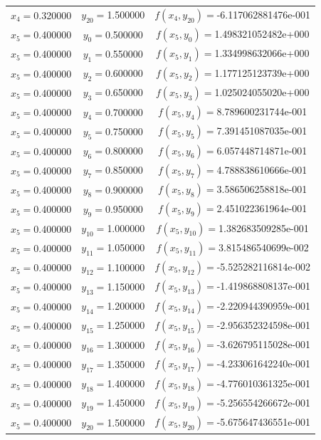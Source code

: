 \begin{longtable}{ccc}
$x_{4}=$0.320000 & $y_{20}=$1.500000 & $f(x_{4},y_{20})=$-6.117062881476e-001 \\
$x_{5}=$0.400000 & $y_{0}=$0.500000 & $f(x_{5},y_{0})=$1.498321052482e+000 \\
$x_{5}=$0.400000 & $y_{1}=$0.550000 & $f(x_{5},y_{1})=$1.334998632066e+000 \\
$x_{5}=$0.400000 & $y_{2}=$0.600000 & $f(x_{5},y_{2})=$1.177125123739e+000 \\
$x_{5}=$0.400000 & $y_{3}=$0.650000 & $f(x_{5},y_{3})=$1.025024055020e+000 \\
$x_{5}=$0.400000 & $y_{4}=$0.700000 & $f(x_{5},y_{4})=$8.789600231744e-001 \\
$x_{5}=$0.400000 & $y_{5}=$0.750000 & $f(x_{5},y_{5})=$7.391451087035e-001 \\
$x_{5}=$0.400000 & $y_{6}=$0.800000 & $f(x_{5},y_{6})=$6.057448714871e-001 \\
$x_{5}=$0.400000 & $y_{7}=$0.850000 & $f(x_{5},y_{7})=$4.788838610666e-001 \\
$x_{5}=$0.400000 & $y_{8}=$0.900000 & $f(x_{5},y_{8})=$3.586506258818e-001 \\
$x_{5}=$0.400000 & $y_{9}=$0.950000 & $f(x_{5},y_{9})=$2.451022361964e-001 \\
$x_{5}=$0.400000 & $y_{10}=$1.000000 & $f(x_{5},y_{10})=$1.382683509285e-001 \\
$x_{5}=$0.400000 & $y_{11}=$1.050000 & $f(x_{5},y_{11})=$3.815486540699e-002 \\
$x_{5}=$0.400000 & $y_{12}=$1.100000 & $f(x_{5},y_{12})=$-5.525282116814e-002 \\
$x_{5}=$0.400000 & $y_{13}=$1.150000 & $f(x_{5},y_{13})=$-1.419868808137e-001 \\
$x_{5}=$0.400000 & $y_{14}=$1.200000 & $f(x_{5},y_{14})=$-2.220944390959e-001 \\
$x_{5}=$0.400000 & $y_{15}=$1.250000 & $f(x_{5},y_{15})=$-2.956352324598e-001 \\
$x_{5}=$0.400000 & $y_{16}=$1.300000 & $f(x_{5},y_{16})=$-3.626795115028e-001 \\
$x_{5}=$0.400000 & $y_{17}=$1.350000 & $f(x_{5},y_{17})=$-4.233061642240e-001 \\
$x_{5}=$0.400000 & $y_{18}=$1.400000 & $f(x_{5},y_{18})=$-4.776010361325e-001 \\
$x_{5}=$0.400000 & $y_{19}=$1.450000 & $f(x_{5},y_{19})=$-5.256554266672e-001 \\
$x_{5}=$0.400000 & $y_{20}=$1.500000 & $f(x_{5},y_{20})=$-5.675647436551e-001 \\

\end{longtable}
